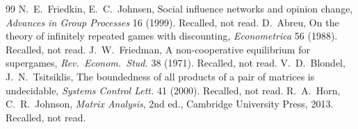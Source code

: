 \documentclass[11pt]{amsart}
\theoremstyle{remark}
\begin{document}
\begin{thebibliography}{99}
 N.~E.~Friedkin, E.~C.~Johnsen, Social influence networks and opinion change, \emph{Advances in Group Processes} 16 (1999). Recalled, not read.
 D.~Abreu, On the theory of infinitely repeated games with discounting, \emph{Econometrica} 56 (1988). Recalled, not read.
 J.~W.~Friedman, A non-cooperative equilibrium for supergames, \emph{Rev.\ Econom.\ Stud.} 38 (1971). Recalled, not read.
 V.~D.~Blondel, J.~N.~Tsitsiklis, The boundedness of all products of a pair of matrices is undecidable, \emph{Systems Control Lett.} 41 (2000). Recalled, not read.
 R.~A.~Horn, C.~R.~Johnson, \emph{Matrix Analysis}, 2nd ed., Cambridge University Press, 2013. Recalled, not read.
\end{thebibliography}
\end{document}
